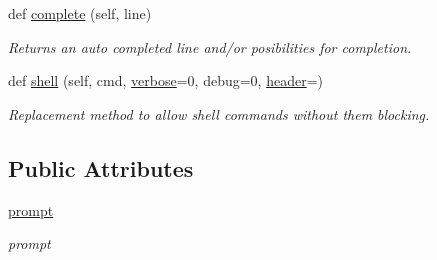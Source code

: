 \begin{DoxyCompactItemize}
def \hyperlink{classvisualizer_1_1ipython__view_1_1IterableIPShell_afed775eb1a75f249c5cc7dc646e1948f}{complete} (self, line)
\begin{DoxyCompactList}\small\item\em Returns an auto completed line and/or posibilities for completion. \end{DoxyCompactList}\item 
def \hyperlink{classvisualizer_1_1ipython__view_1_1IterableIPShell_ae4e79136742f90123cf1bbf73b6cf7f7}{shell} (self, cmd, \hyperlink{openflow-switch_8cc_ab3f078684998b83967d507d0f453f454}{verbose}=0, debug=0, \hyperlink{classvisualizer_1_1ipython__view_1_1IterableIPShell_a5e18bd395d355411a8bc3ed5980fa042}{header}=\textquotesingle{}\textquotesingle{})
\begin{DoxyCompactList}\small\item\em Replacement method to allow shell commands without them blocking. \end{DoxyCompactList}\end{DoxyCompactItemize}
\subsection*{Public Attributes}
\begin{DoxyCompactItemize}
\item 
\hyperlink{classvisualizer_1_1ipython__view_1_1IterableIPShell_a74c8888e64b8cf2d864493d75ba5ebca}{prompt}
\begin{DoxyCompactList}\small\item\em prompt \end{DoxyCompactList}\end{DoxyCompactItemize}
